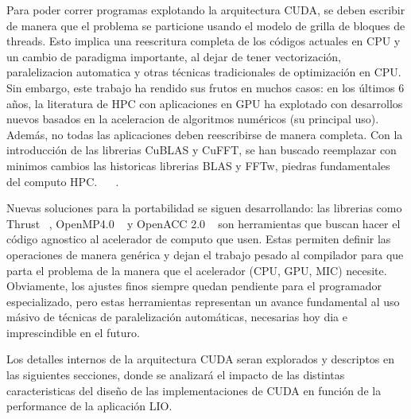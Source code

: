 Para poder correr programas explotando la arquitectura CUDA, se deben escribir de manera que
el problema se particione usando el modelo de grilla de bloques de threads. Esto implica una
reescritura completa de los c\'odigos actuales en CPU y un cambio de paradigma importante, al
dejar de tener vectorizaci\'on, paralelizacion automatica y otras t\'ecnicas tradicionales
de optimizaci\'on en CPU. Sin embargo, este trabajo ha rendido sus frutos en muchos casos:
en los \'ultimos 6 a\~nos, la literatura de HPC con aplicaciones en GPU ha explotado con
desarrollos nuevos basados en la aceleracion de algoritmos num\'ericos (su principal uso).
Adem\'as, no todas las aplicaciones deben reescribirse de manera completa. Con la introducci\'on
de las librerias CuBLAS y CuFFT, se han buscado reemplazar con minimos cambios las historicas
librerias BLAS y FFTw, piedras fundamentales del computo HPC. ~\cite{cublas} ~\cite{cufft}.

Nuevas soluciones para la portabilidad se siguen desarrollando: las librerias como Thrust ~\cite{thrust},
OpenMP4.0 ~\cite{OpenMPspec} y OpenACC 2.0 ~\cite{OpenACCSpec} son herramientas que buscan hacer el
c\'odigo agnostico al acelerador de computo que usen. Estas permiten definir las operaciones de
manera gen\'erica y dejan el trabajo pesado al compilador para que parta el problema de la manera
que el acelerador (CPU, GPU, MIC) necesite. Obviamente, los ajustes finos siempre quedan pendiente para
el programador especializado, pero estas herramientas representan un avance fundamental al uso
m\'asivo de t\'ecnicas de paralelizaci\'on autom\'aticas, necesarias hoy dia e imprescindible en el
futuro.

Los detalles internos de la arquitectura CUDA seran explorados y descriptos en las siguientes secciones,
donde se analizar\'a el impacto de las distintas caracteristicas del dise\~no de las implementaciones
de CUDA en funci\'on de la performance de la aplicaci\'on LIO.
